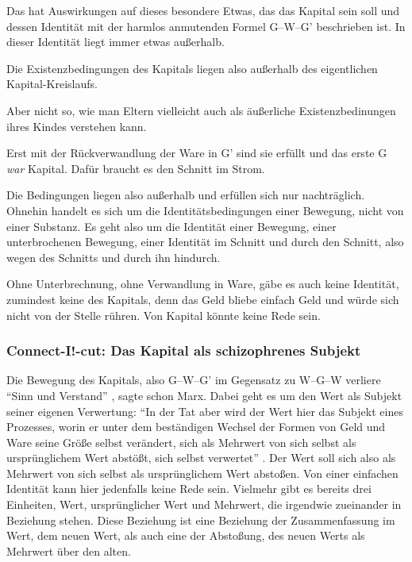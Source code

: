 \documentclass[12pt,
               DIV13,
               paper=a4,
               twoside=false,
               onehalfspacing,
               bibliography=totoc,
               toc=graduated,
               draft,
               ]{scrartcl}
\newcommand{\pc}[2]{\parencite[#1]{#2}}
\newcommand{\gwg}{G--W--G'\xspace}
\newcommand{\wgw}{W--G--W\xspace}
\begin{document}
Das hat Auswirkungen auf dieses besondere Etwas, das das Kapital sein
soll und dessen Identität mit der harmlos anmutenden Formel \gwg
beschrieben ist. In dieser Identität liegt immer etwas außerhalb.

Die Existenzbedingungen des Kapitals liegen also außerhalb des
eigentlichen Kapital-Kreislaufs.

Aber nicht so, wie man Eltern vielleicht auch als äußerliche
Existenzbedinungen ihres Kindes verstehen kann.

Erst mit der Rückverwandlung der Ware
in G' sind sie erfüllt und das erste G \emph{war} Kapital. Dafür
braucht es den Schnitt im Strom.

Die Bedingungen liegen also außerhalb und erfüllen sich nur
nachträglich. Ohnehin handelt es sich um die Identitätsbedingungen
einer Bewegung, nicht von einer Substanz. Es geht also um die
Identität einer Bewegung, einer unterbrochenen Bewegung, einer
Identität im Schnitt und durch den Schnitt, also wegen des Schnitts
und durch ihn hindurch.

Ohne Unterbrechnung, ohne Verwandlung in Ware, gäbe es auch keine
Identität, zumindest keine des Kapitals, denn das Geld bliebe einfach
Geld und würde sich nicht von der Stelle rühren. Von Kapital könnte
keine Rede sein.



\subsubsection{Connect-I!-cut: Das Kapital als schizophrenes Subjekt}

Die Bewegung des Kapitals, also \gwg im Gegensatz zu \wgw verliere
"`Sinn und Verstand"' \pc{166}{kap}, sagte schon Marx. Dabei geht es
um den Wert als Subjekt seiner eigenen Verwertung: "`In der Tat aber
wird der Wert hier das Subjekt eines Prozesses, worin er unter dem
beständigen Wechsel der Formen von Geld und Ware seine Größe selbst
verändert, sich als Mehrwert von sich selbst als ursprünglichem Wert
abstößt, sich selbst verwertet"' \pc{169}{kap}. Der Wert soll sich
also als Mehrwert von sich selbst als ursprünglichem Wert abstoßen.
Von einer einfachen Identität kann hier jedenfalls keine Rede sein.
Vielmehr gibt es bereits drei Einheiten, Wert, ursprünglicher Wert und
Mehrwert, die irgendwie zueinander in Beziehung stehen. Diese
Beziehung ist eine Beziehung der Zusammenfassung im Wert, dem neuen
Wert, als auch eine der Abstoßung, des neuen Werts als Mehrwert über
den alten.
\end{document}
